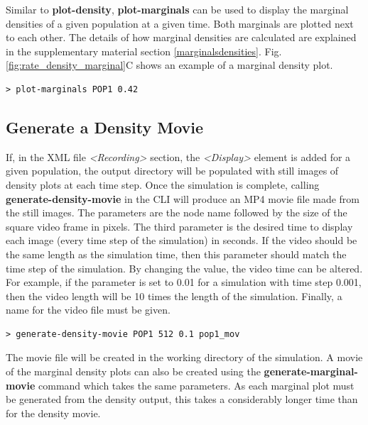 \documentclass[utf8]{frontiersSCNS} %
\begin{document}
Similar to \textbf{plot-density}, \textbf{plot-marginals} can be used to display the marginal densities of a given population at a given time. Both marginals are plotted next to each other. The details of how marginal densities are calculated are explained in the supplementary material section \ref{marginalsdensities}. Fig. \ref{fig:rate_density_marginal}C shows an example of a marginal density plot.

\begin{lstlisting}[language=xml,caption={Plot the marginal distributions of population POP1 at time 0.42s in the CLI.}]
> plot-marginals POP1 0.42
\end{lstlisting}

\subsection{Generate a Density Movie}
\label{densitymovie}
If, in the XML file \textit{\textless Recording\textgreater} section, the \textit{\textless Display\textgreater} element is added for a given population, the output directory will be populated with still images of density plots at each time step. Once the simulation is complete, calling \textbf{generate-density-movie} in the CLI will produce an MP4 movie file made from the still images. The parameters are the node name followed by the size of the square video frame in pixels. The third parameter is the desired time to display each image (every time step of the simulation) in seconds. If the video should be the same length as the simulation time, then this parameter should match the time step of the simulation. By changing the value, the video time can be altered. For example, if the parameter is set to 0.01 for a simulation with time step 0.001, then the video length will be 10 times the length of the simulation. Finally, a name for the video file must be given.

\begin{lstlisting}[language=xml,caption={Generate a movie from the display images of population POP1 with a size of 512 pixels at a simulation replay time step of 0.1s.}]
> generate-density-movie POP1 512 0.1 pop1_mov
\end{lstlisting}

The movie file will be created in the working directory of the simulation. A movie of the marginal density plots can also be created using the \textbf{generate-marginal-movie} command which takes the same parameters. As each marginal plot must be generated from the density output, this takes a considerably longer time than for the density movie.
\end{document}

